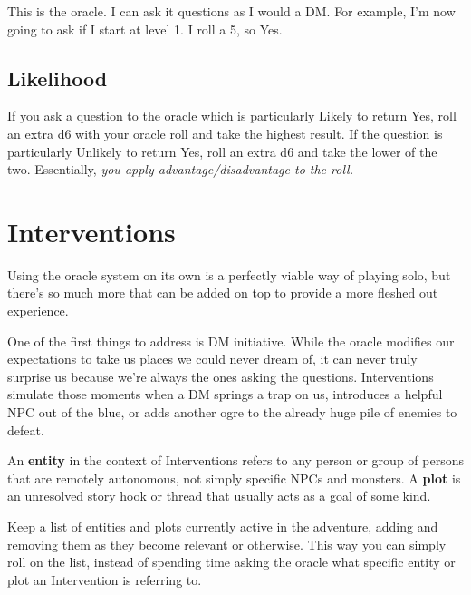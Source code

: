 \documentclass[12pt, letterpaper]{article}
\begin{document}
\noindent
\begin{minipage}[t]{\wd\oracletbl}
\vspace{0pt}
\usebox{\oracletbl}
\end{minipage}%
\hspace{1em}%
\begin{minipage}[t]{\dimexpr\linewidth-\wd\oracletbl-1em\relax}
\vspace{0pt}
This is the oracle. I can ask it questions as I would a DM. For example, I'm now going to ask if I start at level 1. I roll a 5, so Yes.

\subsection*{Likelihood}

If you ask a question to the oracle which is particularly Likely to return Yes, roll an extra d6 with your oracle roll and take the highest result. If the question is particularly Unlikely to return Yes, roll an extra d6 and take the lower of the two. Essentially, \textit{you apply advantage/disadvantage to the roll.}

\end{minipage}

\section*{Interventions}

Using the oracle system on its own is a perfectly viable way of playing solo, but there's so much more that can be added on top to provide a more fleshed out experience.

One of the first things to address is DM initiative. While the oracle modifies our expectations to take us places we could never dream of, it can never truly surprise us because we're always the ones asking the questions. Interventions simulate those moments when a DM springs a trap on us, introduces a helpful NPC out of the blue, or adds another ogre to the already huge pile of enemies to defeat.

An \textbf{entity} in the context of Interventions refers to any person or group of persons that are remotely autonomous, not simply specific NPCs and monsters. A \textbf{plot} is an unresolved story hook or thread that usually acts as a goal of some kind.

Keep a list of entities and plots currently active in the adventure, adding and removing them as they become relevant or otherwise. This way you can simply roll on the list, instead of spending time asking the oracle what specific entity or plot an Intervention is referring to.
\end{document}
